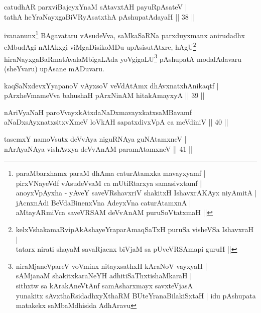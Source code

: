 
\begin{shl}
catudhAR parxviBajeyxYnaM sAtavxtAH payuRpAsateV |\\
tathA heYraNayxgaBiVRyAsatxthA pAshupatAdayaH \hfill || 38 ||
\end{shl}

\begin{artha}%
ivananunx\footnote[1]{paraMbarxhamx paraM dhAma caturAtamxka mavayxyamf |\\
pirxVNayeVdf vAsudeVvaM ca mUtiRtarxya samasivxtamf |\\
anoyxVpAyxha - yAveY saveVRshavxriV shakitxH IshavxrAKAyx niyAmitA |\\
jAcnxnAdi BeVdaBinenxVna AdeyxVna caturAtamxnA |\\
aMtayARmiVca saveVRSAM deVvAnAM puruSoVtatxmaH ||} BAgavataru vAsudeVva, saMkaSaRNa parxduyxmanx anirudadhx eMbudAgi nAlAkxgi viMgaDisikoMDu upAsisutAtxre, hAgU\footnote[2]{kelxVshakamaRvipAkAshayeYraparAmaqSaTxH puruSa visheVSa IshavxraH |\\tatarx nirati shayaM savaRjacnx biVjaM sa pUveVRSAmapi guruH ||} hiraNayxgaBaRmatAvalaMbi\-gaLAda yoVgigaLU\footnote[3]{niraMjaneVpareV voVminx nitayxsathxH kAraNoV vayxyaH |\\
sAMjanaM shakitxkaraNeYH adhitiSaThxtishaMkaraH |\\
sithxtw sa kArakAneVtAnf samAsharxmayx savxteVjasA | \\
yunakitx sAvxthaRsidadhxyXthaRM BUteYranaBilakiSxtaH | idu pAshupata matakekx saMbaMdhisida AdhAravu} pAshupatA modalAdavaru (sheYvaru) upAsane mADuvaru.
\end{artha}

\begin{shl}
kaqSaNxdevxYyapanoV vAyxsoV veVdAtAmx dhAvxnatxhAnikaqtf |\\
pArxheVmameVva bahushaH pArxNinAM hitakAmayxyA \hfill || 39 ||
\end{shl}

\begin{shl}
nAriVyaNaH paroV\s vayxkAtxdaNaDxmavayxkatxsaMBavamf |\\
aNaDxsAyxnatxsitxvXmeV loVkAH sapatxdivxVpA ca meVdiniV \hfill || 40 ||
\end{shl}

\begin{shl}
tasemxY namoV\s sutx deVvAya niguRNAya guNAtamxneV |\\
nArAyaNAya vishAvxya deVvAnAM paramAtamxneV \hfill || 41 ||
\end{shl}

